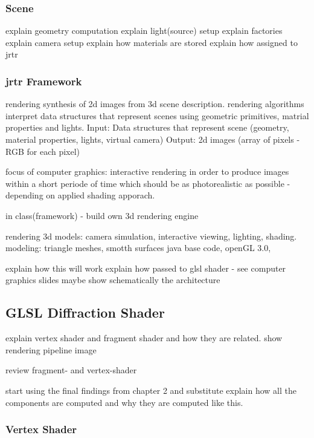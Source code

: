 \subsubsection{Scene}
explain geometry computation
explain light(source) setup
explain factories
explain camera setup
explain how materials are stored
explain how assigned to jrtr



\subsubsection{jrtr Framework}

rendering synthesis of 2d images from 3d scene description. rendering algorithms interpret data structures that represent scenes using geometric primitives, matrial properties and lights.
Input: Data structures that represent scene (geometry, material properties, lights, virtual camera)
Output: 2d images (array of pixels - RGB for each pixel)

focus of computer graphics: interactive rendering in order to produce images within a short periode of time which should be as photorealistic as possible - depending on applied shading apporach.


in class(framework) - build own 3d rendering engine

rendering 3d models: camera simulation, interactive viewing, lighting, shading. 
modeling: triangle meshes, smotth surfaces
java base code, openGL 3.0, 



explain how this will work
explain how passed to glsl shader - see computer graphics slides
maybe show schematically the architecture

\subsection{GLSL Diffraction Shader}
explain vertex shader and fragment shader and how they are related.
show rendering pipeline image

review fragment- and vertex-shader

start using the final findings from chapter 2 and substitute
explain how all the components are computed and why they are computed like this.

\subsubsection{Vertex Shader}

